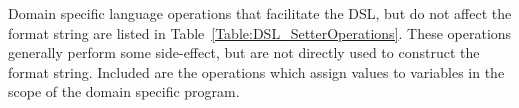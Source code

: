 








Domain specific language operations that facilitate the DSL, but do not affect the format string are listed in Table~\ref{Table:DSL_SetterOperations}. These operations generally perform some side-effect, but are not directly used to construct the format string. Included are the operations which assign values to variables in the scope of the domain specific program.

